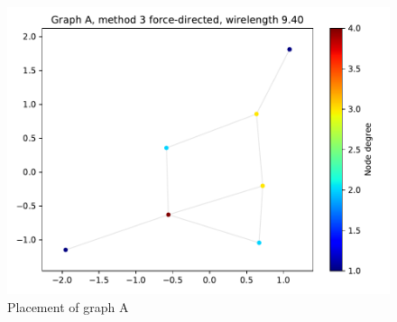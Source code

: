 \documentclass[a4paper,twocolumn]{article}
\begin{document}
\begin{figure}[h]
	\includegraphics[width=\columnwidth]{fig/A/spring.pdf}
	\caption{Placement of graph A}
	\label{fig:graphA}
\end{figure}
\end{document}
